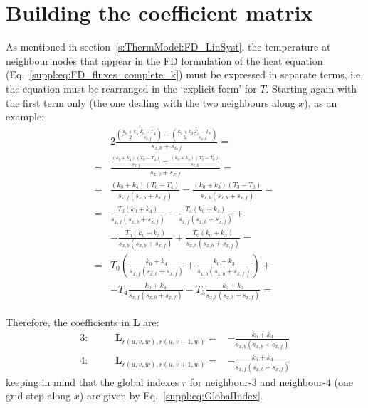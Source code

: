 \section{Building the coefficient matrix}
\label{s:ThermModel:FD_CoeffMatrix}
As mentioned in section~\ref{s:ThermModel:FD_LinSyst}, the temperature at neighbour nodes that appear in the FD formulation of the heat equation (Eq.~\ref{suppl:eq:FD_fluxes_complete_k}) must be expressed in separate terms, i.e. the equation must be rearranged in the `explicit form' for $T$.
Starting again with the first term only (the one dealing with the two neighbours along $x$), as an example:
\begin{align}
\begin{split}  
    \label{suppl:eq:FD_fluxes_complete_k_x_term}
    & 2 \frac{
        \left(
            \displaystyle \frac{k_0 + k_4}{2}
            \displaystyle \frac{T_0 - T_4}{s_{x,f}}
        \right ) -
        \left(
            \displaystyle \frac{k_0 + k_3}{2}
            \displaystyle \frac{T_3 - T_0}{s_{x,b}}
        \right )
    }{s_{x,b} + s_{x,f}} = \\[2ex]
    = &
    \frac{
        \displaystyle\frac{(k_0 + k_4) (T_0 - T_4)}{s_{x,f}} -
        \displaystyle\frac{(k_0 + k_3) (T_3 - T_0)}{s_{x,b}}
        }
    {s_{x,b} + s_{x,f}} = \\[2ex]
    = &
    \frac{(k_0 + k_4) (T_0 - T_4)}{s_{x,f} (s_{x,b} + s_{x,f})} -
    \frac{(k_0 + k_3) (T_3 - T_0)}{s_{x,b} (s_{x,b} + s_{x,f})} = \\[2ex]
    = &
    \frac{T_0 (k_0 + k_4)}{s_{x,f} (s_{x,b} + s_{x,f})} -
    \frac{T_4 (k_0 + k_4)}{s_{x,f} (s_{x,b} + s_{x,f})} + \\
    & - \frac{T_3 (k_0 + k_3)}{s_{x,b} (s_{x,b} + s_{x,f})} +
    \frac{T_0 (k_0 + k_3)}{s_{x,b} (s_{x,b} + s_{x,f})} = \\[2ex]
    = &
    T_0 \left(
        \frac{k_0 + k_4}{s_{x,f} (s_{x,b} + s_{x,f})} +
        \frac{k_0 + k_3}{s_{x,b} (s_{x,b} + s_{x,f})}
    \right) + \\
    & - T_4 \frac{k_0 + k_4}{s_{x,f} (s_{x,b} + s_{x,f})}
    - T_3 \frac{k_0 + k_3}{s_{x,b} (s_{x,b} + s_{x,f})} =
\end{split}
\end{align}

Therefore, the coefficients in $\bm{L}$ are:
\begin{align}
    \label{suppl:eq:L_coefficients_x_term}
    3: &&\quad \bm{L}_{r(u,v,w),r(u,v-1,w)} = & - \frac{k_0 + k_3}{s_{x,b} (s_{x,b} + s_{x,f})} \\[2ex]
    4: &&\quad \bm{L}_{r(u,v,w),r(u,v+1,w)} = & - \frac{k_0 + k_4}{s_{x,f} (s_{x,b} + s_{x,f})}
\end{align}
keeping in mind that the global indexes $r$ for neighbour-$3$ and neighbour-$4$ (one grid step along $x$) are given by Eq.~\ref{suppl:eq:GlobalIndex}.

